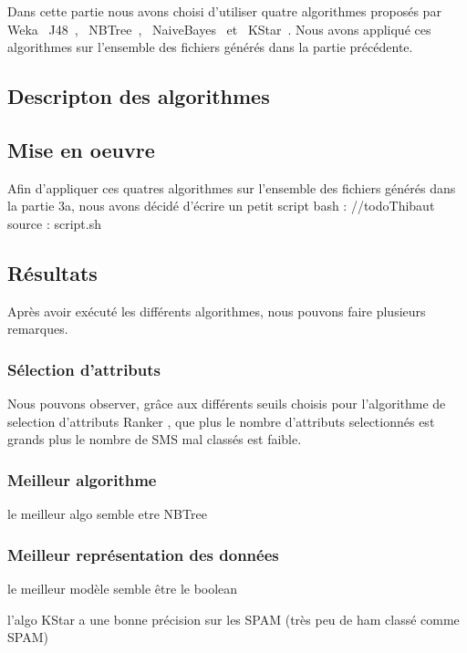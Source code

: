 Dans cette partie nous avons choisi d'utiliser quatre algorithmes proposés par Weka \og~J48~\fg{}, \og~NBTree~\fg{}, \og~NaiveBayes~\fg{} et \og~KStar~\fg{}. Nous avons appliqué ces algorithmes sur l'ensemble des fichiers générés dans la partie précédente.

\subsection{Descripton des algorithmes}


\subsection{Mise en oeuvre}

Afin d'appliquer ces quatres algorithmes sur l'ensemble des fichiers générés dans la partie 3a, nous avons décidé d'écrire un petit script bash :
//todo{Thibaut} source : script.sh

\subsection{Résultats}

Après avoir exécuté les différents algorithmes, nous pouvons faire plusieurs remarques.

\subsubsection{Sélection d'attributs}
Nous pouvons observer, grâce aux différents seuils choisis pour l'algorithme de selection d'attributs \og Ranker \fg{}, que plus le nombre d'attributs selectionnés est grands plus le nombre de SMS mal classés est faible.

\subsubsection{Meilleur algorithme}
    le meilleur algo semble etre NBTree

\subsubsection{Meilleur représentation des données}
    le meilleur modèle semble être le boolean 

    l'algo KStar a une bonne précision sur les SPAM (très peu de ham classé comme SPAM)



